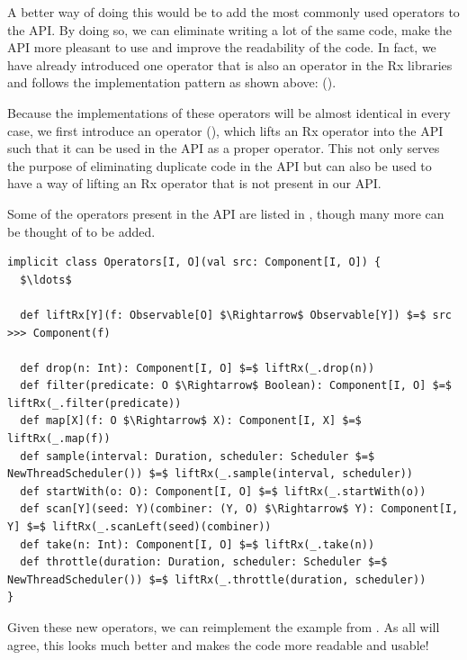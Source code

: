 A better way of doing this would be to add the most commonly used operators to the \comp API. By doing so, we can eliminate writing a lot of the same code, make the API more pleasant to use and improve the readability of the code. In fact, we have already introduced one operator that is also an operator in the Rx libraries and follows the implementation pattern as shown above:  ().

Because the implementations of these operators will be almost identical in every case, we first introduce an operator  (), which lifts an Rx operator into the \comp API such that it can be used in the API as a proper operator. This not only serves the purpose of eliminating duplicate code in the API but can also be used to have a way of lifting an Rx operator that is not present in our API.

Some of the operators present in the API are listed in , though many more can be thought of to be added.

\begin{minipage}{\linewidth}
\begin{lstlisting}[style=ScalaStyle, caption={Rx style operators}, label={lst:rx-style-operators}]
implicit class Operators[I, O](val src: Component[I, O]) {
  $\ldots$

  def liftRx[Y](f: Observable[O] $\Rightarrow$ Observable[Y]) $=$ src >>> Component(f)
  
  def drop(n: Int): Component[I, O] $=$ liftRx(_.drop(n))
  def filter(predicate: O $\Rightarrow$ Boolean): Component[I, O] $=$ liftRx(_.filter(predicate))
  def map[X](f: O $\Rightarrow$ X): Component[I, X] $=$ liftRx(_.map(f))
  def sample(interval: Duration, scheduler: Scheduler $=$ NewThreadScheduler()) $=$ liftRx(_.sample(interval, scheduler))
  def startWith(o: O): Component[I, O] $=$ liftRx(_.startWith(o))
  def scan[Y](seed: Y)(combiner: (Y, O) $\Rightarrow$ Y): Component[I, Y] $=$ liftRx(_.scanLeft(seed)(combiner))
  def take(n: Int): Component[I, O] $=$ liftRx(_.take(n))
  def throttle(duration: Duration, scheduler: Scheduler $=$ NewThreadScheduler()) $=$ liftRx(_.throttle(duration, scheduler))
}
\end{lstlisting}
\end{minipage}

Given these new operators, we can reimplement the  example from . As all will agree, this looks much better and makes the code more readable and usable!

